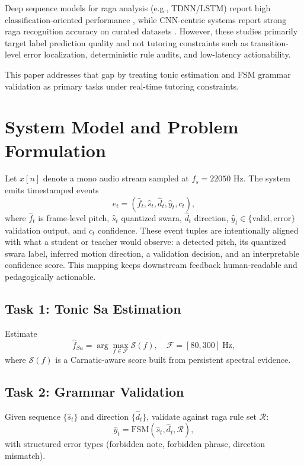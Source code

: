 \documentclass{ieeeaccess}
\begin{document}
Deep sequence models for raga analysis (e.g., TDNN/LSTM) report high classification-oriented performance \cite{b3,b4}, while CNN-centric systems report strong raga recognition accuracy on curated datasets \cite{b5,b6}. However, these studies primarily target label prediction quality and not tutoring constraints such as transition-level error localization, deterministic rule audits, and low-latency actionability.

This paper addresses that gap by treating tonic estimation and FSM grammar validation as primary tasks under real-time tutoring constraints.

\section{System Model and Problem Formulation}
\label{sec:problem}
Let $x[n]$ denote a mono audio stream sampled at $f_s=22050$ Hz. The system emits timestamped events
\begin{equation}
e_t = (\hat{f}_t, \hat{s}_t, \hat{d}_t, \hat{y}_t, c_t),
\end{equation}
where $\hat{f}_t$ is frame-level pitch, $\hat{s}_t$ quantized swara, $\hat{d}_t$ direction, $\hat{y}_t\in\{\text{valid},\text{error}\}$ validation output, and $c_t$ confidence.
These event tuples are intentionally aligned with what a student or teacher would observe: a detected pitch, its quantized swara label, inferred motion direction, a validation decision, and an interpretable confidence score. This mapping keeps downstream feedback human-readable and pedagogically actionable.

\subsection{Task 1: Tonic Sa Estimation}
Estimate
\begin{equation}
\hat{f}_{Sa}=\arg\max_{f\in\mathcal{F}}\mathcal{S}(f),\quad \mathcal{F}=[80,300]~\text{Hz},
\end{equation}
where $\mathcal{S}(f)$ is a Carnatic-aware score built from persistent spectral evidence.

\subsection{Task 2: Grammar Validation}
Given sequence $\{\hat{s}_t\}$ and direction $\{\hat{d}_t\}$, validate against raga rule set $\mathcal{R}$:
\begin{equation}
\hat{y}_t = \text{FSM}(\hat{s}_t,\hat{d}_t,\mathcal{R}),
\end{equation}
with structured error types (forbidden note, forbidden phrase, direction mismatch).
\end{document}
